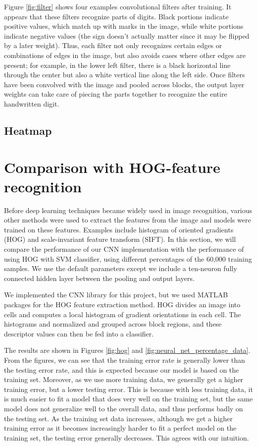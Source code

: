 \documentclass[10pt,twocolumn]{article}
\begin{document}
Figure \ref{fig:filter} shows four examples convolutional filters after training. It appears that these filters recognize parts of digits. Black portions indicate positive values, which match up with marks in the image, while white portions indicate negative values (the sign doesn't actually matter since it may be flipped by a later weight). Thus, each filter not only recognizes certain edges or combinations of edges in the image, but also avoids cases where other edges are present; for example, in the lower left filter, there is a black horizontal line through the center but also a white vertical line along the left side. Once filters have been convolved with the image and pooled across blocks, the output layer weights can take care of piecing the parts together to recognize the entire handwritten digit.

\subsection{Heatmap}

\section{Comparison with HOG-feature recognition} \label{sec:evalfeature}

Before deep learning techniques became widely used in image recognition, various other methods were used to extract the features from the image and models were trained on these features. Examples include histogram of oriented gradients (HOG) and scale-invariant feature transform (SIFT). In this section, we will compare the performance of our CNN implementation with the performance of using HOG with SVM classifier, using different percentages of the 60,000 training samples. We use the default parameters except we include a ten-neuron fully connected hidden layer between the pooling and output layers.

We implemented the CNN library for this project, but we used MATLAB packages for the HOG feature extraction method. HOG divides an image into cells and computes a local histogram of gradient orientations in each cell. The histograms and normalized and grouped across block regions, and these descriptor values can then be fed into a classifier.

The results are shown in Figures \ref{fig:hog} and \ref{fig:neural_net_percentage_data}. From the figures, we can see that the training error rate is generally lower than the testing error rate, and this is expected because our model is based on the training set. Moreover, as we use more training data, we generally get a higher training error, but a lower testing error. This is because with less training data, it is much easier to fit a model that does very well on the training set, but the same model does not generalize well to the overall data, and thus performs badly on the testing set. As the training set data increases, although we get a higher training error as it becomes increasingly harder to fit a perfect model on the training set, the testing error generally decreases. This agrees with our intuition.
\end{document}
